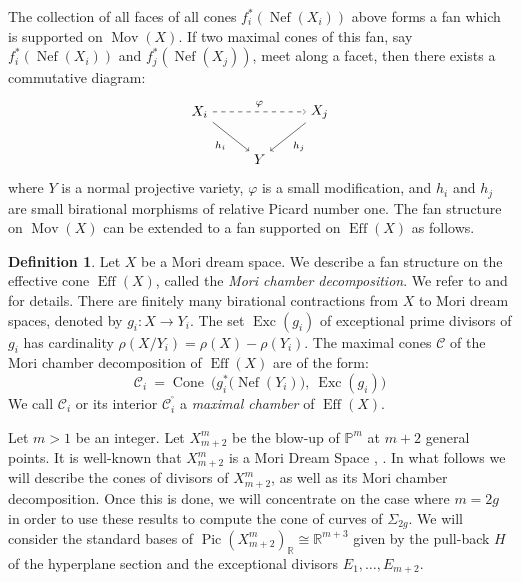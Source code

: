 \documentclass[a4paper,10pt]{amsart}
\theoremstyle{definition}
\newtheorem{Definition}[thm]{Definition}
\DeclareMathOperator{\Pic}{Pic}
\DeclareMathOperator{\Eff}{Eff}
\DeclareMathOperator{\Exc}{Exc}
\DeclareMathOperator{\Cone}{Cone}
\DeclareMathOperator{\Nef}{Nef}
\DeclareMathOperator{\Mov}{Mov}
\begin{document}
The collection of all faces of all cones $f_i^*(\Nef{(X_i)})$ above forms a fan which is supported on $\Mov(X)$.
If two maximal cones of this fan, say $f_i^*(\Nef{(X_i)})$ and $f_j^*(\Nef{(X_j)})$, meet along a facet,
then there exists a commutative diagram: 
  \[
  \begin{tikzpicture}[xscale=1.5,yscale=-1.2]
    \node (A0_0) at (0, 0) {$X_i$};
    \node (A0_2) at (2, 0) {$X_{j}$};
    \node (A1_1) at (1, 1) {$Y$};
    \path (A0_0) edge [->,swap]node [auto] {$\scriptstyle{h_i}$} (A1_1);
    \path (A0_2) edge [->]node [auto] {$\scriptstyle{h_j}$} (A1_1);
    \path (A0_0) edge [->,dashed]node [auto] {$\scriptstyle{\varphi}$}  (A0_2);
  \end{tikzpicture}
  \]
where $Y$ is a normal projective variety, $\varphi$ is a small modification, and $h_i$ and $h_j$ are small birational morphisms
of relative Picard number one. 
The fan structure on $\Mov(X)$ can be extended to a fan supported on $\Eff(X)$ as follows. 

\begin{Definition}\label{MCD}
Let $X$ be a Mori dream space. We describe a fan structure on the effective cone $\Eff(X)$, called the \emph{Mori chamber decomposition}. We refer to \cite[Proposition 1.11]{HK00} and \cite[Section 2.2]{Ok16} for details.
There are finitely many birational contractions from $X$ to Mori dream spaces, denoted by $g_i:X\rightarrow Y_i$.
The set $\Exc(g_i)$ of exceptional prime divisors of $g_i$ has cardinality $\rho(X/Y_i)=\rho(X)-\rho(Y_i)$.
The maximal cones $\mathcal{C}$ of the Mori chamber decomposition of $\Eff(X)$ are of the form:
$$
\mathcal{C}_i \ = \Cone \ \Big(g_i^*\big(\Nef(Y_i)\big),\:\Exc(g_i)\Big)
$$
We call $\mathcal{C}_i$ or its interior $\mathcal{C}_i^{^\circ}$ a \emph{maximal chamber} of $\Eff(X)$.
\end{Definition}

Let $m>1$ be an integer. Let $X_{m+2}^m$ be the blow-up of $\mathbb{P}^m$ at $m+2$ general points. It is well-known that $X_{m+2}^m$ is a Mori Dream Space \cite[Theorem 1.3]{CT06}, \cite[Theorem 1.3]{AM16}. 
In what follows we will describe the cones of divisors of $X_{m+2}^m$, as well as its Mori chamber decomposition. Once this is done, we will concentrate on the case where $m=2g$ in order to use these results to compute the cone of curves of $\Sigma_{2g}$. We will consider the standard bases of $\Pic(X_{m+2}^m)_{\mathbb{R}}\cong\mathbb{R}^{m+3}$ given by the pull-back $H$ of the hyperplane section and the exceptional divisors $E_1,\dots,E_{m+2}$. 
\end{document}
